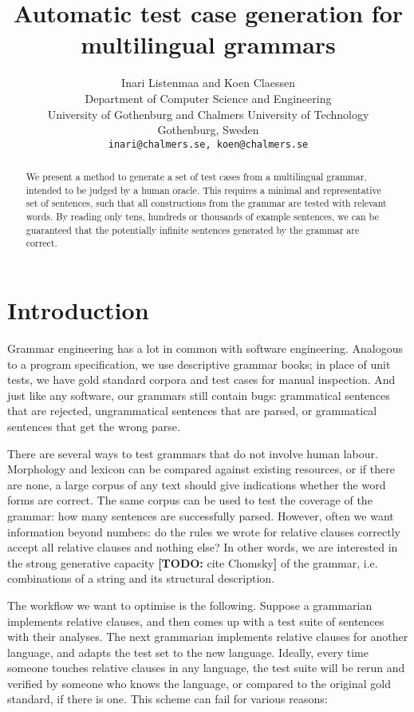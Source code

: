 \documentclass[11pt]{article}
\title{Automatic test case generation for multilingual grammars}
\author{Inari Listenmaa and Koen Claessen \\
  Department of Computer Science and Engineering \\
  University of Gothenburg and Chalmers University of Technology \\
  Gothenburg, Sweden \\
  {\tt inari@chalmers.se, koen@chalmers.se} }
\date{}
\newcommand{\todo}[1]{{\color{cyan}\textbf{[TODO: }#1\textbf{]}}}
\begin{document}
\maketitle
\begin{abstract}
  We present a method to generate a set of test cases from a multilingual
  grammar, intended to be judged by a human oracle. This requires a
  minimal and representative set of sentences, such that all
  constructions from the grammar are tested with relevant words. By
  reading only tens, hundreds or thousands of example sentences, we
  can be guaranteed that the potentially infinite sentences
  generated by the grammar are correct.
\end{abstract}

\section{Introduction}


Grammar engineering has a lot in common with software
engineering. Analogous to a program specification, we use
descriptive grammar books; in place of unit tests, we have gold
standard corpora and test cases for manual inspection.
And just like any software, our grammars still contain bugs:
grammatical sentences that are rejected, ungrammatical
sentences that are parsed, or grammatical sentences that get the wrong
parse.

There are several ways to test grammars that do not involve human
labour. Morphology and lexicon can be compared against existing resources, or
if there are none, a large corpus of any text should give indications
whether the word forms are correct. The same corpus can be used to
test the coverage of the grammar: how many sentences are successfully parsed.
However, often we want information beyond numbers: do the rules we
wrote for relative clauses correctly accept all relative clauses and
nothing else? In other words, we are interested in the strong
generative capacity \todo{cite Chomsky} of the grammar, i.e. combinations
of a string and its structural description.

The workflow we want to optimise is the following. Suppose a
grammarian implements relative clauses, and then comes up with a test
suite of sentences with their analyses. The next grammarian implements
relative clauses for another language, and adapts the test set to the
new language.
Ideally, every time someone touches relative clauses 
in any language, the test suite will be rerun and verified by
someone who knows the language, or compared to the original gold standard, 
if there is one. This scheme can fail for various reasons: 
\end{document}
